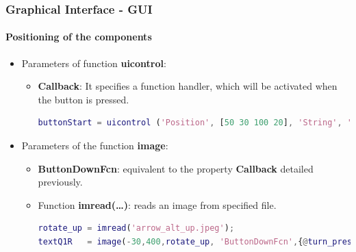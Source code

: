 \documentclass[10pt]{beamer}
\begin{document}
\begin{frame}[fragile]
\frametitle{Graphical Interface - GUI}
\framesubtitle{Positioning of the components}

\begin{itemize}
  	\item Parameters of function \textbf{uicontrol}:
	
	\begin{itemize}
	  
		\item \textbf{Callback}: It specifies a function handler, which will be
		activated when the button is pressed. \\
\begin{lstlisting}[language=Matlab]
buttonStart = uicontrol ('Position', [50 30 100 20], 'String', 'Start Game','Callback', @start_pressed);
\end{lstlisting}
	\end{itemize}
	
	
	\item Parameters of the function \textbf{image}:
	
	\begin{itemize}
	  
		\item \textbf{ButtonDownFcn}: equivalent to the property \textbf{Callback}
		detailed previously. 
		\item Function \textbf{imread(\ldots)}: reads an image from specified file.
\begin{lstlisting}[language=Matlab]
rotate_up = imread('arrow_alt_up.jpeg');
textQ1R   = image(-30,400,rotate_up, 'ButtonDownFcn',{@turn_pressed, 1, 'L'});
\end{lstlisting}
	\end{itemize}
	
\end{itemize}
\end{frame}
\end{document}
